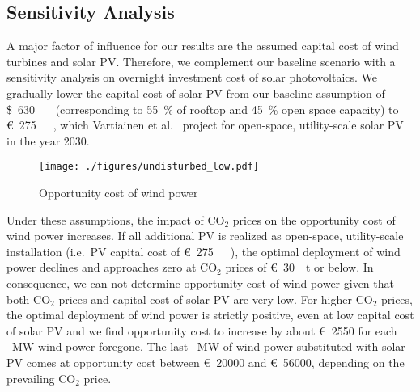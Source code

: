 \documentclass[review, 3p, times, 12pt]{elsarticle} %
\newcommand{\COO}{\ensuremath{\mathrm{CO_2}} }
\begin{document}
\subsection{Sensitivity Analysis} \label{subsec:sensitivity}
A major factor of influence for our results are the assumed capital cost of wind turbines and solar PV\@.
Therefore, we complement our baseline scenario with a sensitivity analysis on overnight investment cost of solar
photovoltaics.
We gradually lower the capital cost of solar PV from our baseline assumption of \SI{630}[\$]{\per\kilo\wattpeak}
(corresponding to \SI{55}{\percent} of rooftop and \SI{45}{\percent} open space capacity) to
\SI{275}[\euro]{\per\kilo\wattpeak}, which Vartiainen et al.~\cite{Vartiainen2019} project for open-space,
utility-scale solar PV in the year 2030.

\begin{figure*}[h!t]
\centering
\texttt{[image: ./figures/undisturbed\_low.pdf]}
\caption{Opportunity cost of wind power}
\end{figure*}

Under these assumptions, the impact of \COO prices on the opportunity cost of wind power increases.
If all additional PV is realized as open-space, utility-scale installation (i.e.\ PV capital cost of
\SI{275}[\euro]{\per\kilo\wattpeak}), the optimal deployment of wind power declines and approaches zero at \COO prices
of \SI{30}[\euro]{\per\tonne} or below.
In consequence, we can not determine opportunity cost of wind power given that both \COO prices and capital cost of
solar PV are very low.
For higher \COO prices, the optimal deployment of wind power is strictly positive, even at low capital cost of solar
PV and we find opportunity cost to increase by about \SI{2550}[\euro]{} for each \SI{}{\mega\watt} wind power
foregone.
The last \SI{}{\mega\watt} of wind power substituted with solar PV comes at opportunity cost between
\SI{20000}[\euro]{} and \SI{56000}[\euro]{}, depending on the prevailing \COO price.
\end{document}
